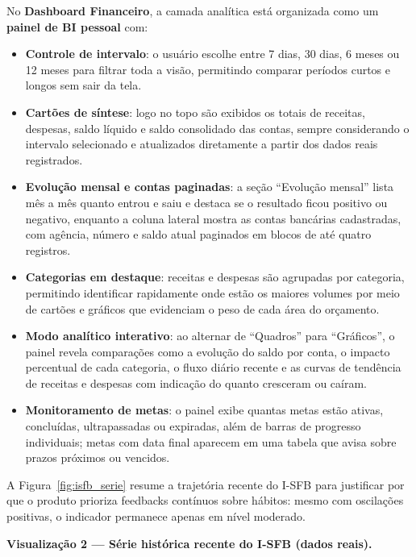 No \textbf{Dashboard Financeiro}, a camada analítica está organizada como um \textbf{painel de BI pessoal} com:
\begin{itemize}
    \item \textbf{Controle de intervalo}: o usuário escolhe entre 7 dias, 30 dias, 6 meses ou 12 meses para filtrar toda a visão, permitindo comparar períodos curtos e longos sem sair da tela.
    \item \textbf{Cartões de síntese}: logo no topo são exibidos os totais de receitas, despesas, saldo líquido e saldo consolidado das contas, sempre considerando o intervalo selecionado e atualizados diretamente a partir dos dados reais registrados.
    \item \textbf{Evolução mensal e contas paginadas}: a seção ``Evolução mensal'' lista mês a mês quanto entrou e saiu e destaca se o resultado ficou positivo ou negativo, enquanto a coluna lateral mostra as contas bancárias cadastradas, com agência, número e saldo atual paginados em blocos de até quatro registros.
    \item \textbf{Categorias em destaque}: receitas e despesas são agrupadas por categoria, permitindo identificar rapidamente onde estão os maiores volumes por meio de cartões e gráficos que evidenciam o peso de cada área do orçamento.
    \item \textbf{Modo analítico interativo}: ao alternar de ``Quadros'' para ``Gráficos'', o painel revela comparações como a evolução do saldo por conta, o impacto percentual de cada categoria, o fluxo diário recente e as curvas de tendência de receitas e despesas com indicação do quanto cresceram ou caíram.
    \item \textbf{Monitoramento de metas}: o painel exibe quantas metas estão ativas, concluídas, ultrapassadas ou expiradas, além de barras de progresso individuais; metas com data final aparecem em uma tabela que avisa sobre prazos próximos ou vencidos.
\end{itemize}

A Figura~\ref{fig:isfb_serie} resume a trajetória recente do I-SFB para justificar por que o produto prioriza feedbacks contínuos sobre hábitos: mesmo com oscilações positivas, o indicador permanece apenas em nível moderado.

\vspace{0.5em}
\textbf{Visualização 2 — Série histórica recente do I-SFB (dados reais).}

